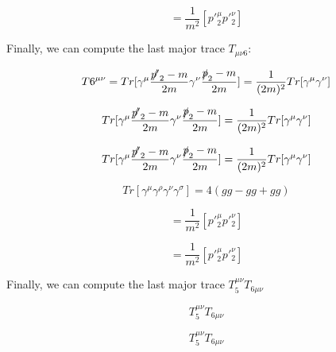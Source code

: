 \documentclass[a4]{article}
\begin{document}
    \begin{framed}
        \begin{equation}
            = \frac{1}{m^2} [p'^{\mu}_2 p'^{\nu}_2]
        \end{equation}
    \end{framed}

    Finally, we can compute the last major trace $T_{\mu \nu 6}$:

    \begin{equation}
        T6^{\mu \nu} = Tr [\gamma^\mu \frac{\slashed{p'}_2 - m}{2m} \gamma^\nu \frac{\slashed{p}_2 - m}{2 m}] = \frac{1}{(2m)^2} Tr[\gamma^\mu \gamma^\nu]
    \end{equation}

    \begin{equation}
        Tr [\gamma^\mu \frac{\slashed{p'}_2 - m}{2m} \gamma^\nu \frac{\slashed{p}_2 - m}{2 m}] = \frac{1}{(2m)^2} Tr[\gamma^\mu \gamma^\nu]
    \end{equation}

    \begin{equation}
        Tr [\gamma^\mu \frac{\slashed{p'}_2 - m}{2m} \gamma^\nu \frac{\slashed{p}_2 - m}{2 m}] = \frac{1}{(2m)^2} Tr[\gamma^\mu \gamma^\nu]
    \end{equation}

    \begin{equation}
        Tr [\gamma^\mu \gamma^\rho \gamma^\nu \gamma^\sigma] = 4(g g - g g + g g)
    \end{equation}

    \begin{equation}
        = \frac{1}{m^2} [p'^{\mu}_2 p'^{\nu}_2]
    \end{equation}

    \begin{framed}
        \begin{equation}
            = \frac{1}{m^2} [p'^{\mu}_2 p'^{\nu}_2]
        \end{equation}
    \end{framed}

    Finally, we can compute the last major trace $T_5^{\mu \nu} T_{6 \mu \nu}$

    \begin{equation}
        T_5^{\mu \nu} T_{6 \mu \nu}
    \end{equation}

    \begin{equation}
        T_5^{\mu \nu} T_{6 \mu \nu}
    \end{equation}
\end{document}
